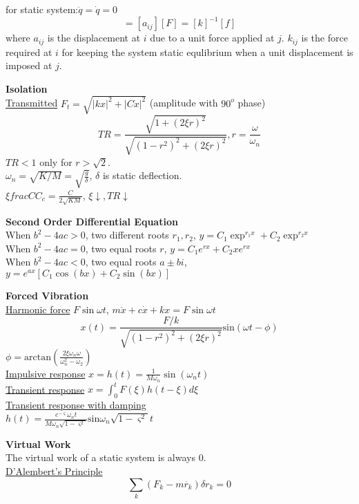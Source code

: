 \documentclass{article}
\begin{document}
\begin{multicols*}{3}
for static system:$\ddot{q}=\dot{q}=0$
\begin{equation*}
  [q]=[a_{ij}][F]=[k]^{-1}[f]
\end{equation*}
where $a_{ij}$ is the displacement at $i$ due to a unit force applied at $j$.
$k_{ij}$ is the force required at $i$ for keeping the system static equlibrium when a unit displacement is imposed at $j$.

\noindent\textbf{Isolation}\\
\underline{Transmitted} $F_{t}=\sqrt{|kx|^{2}+|C\dot{x}|^{2}}$ (amplitude with $90^{o}$ phase)
\begin{equation*}
  TR=\frac{\sqrt{1+(2\xi r)^{2}}}{\sqrt{(1-r^{2})^{2}+(2\xi r)^{2}}}, r=\frac{\omega}{\omega_{n}}
\end{equation*}
$TR<1$ only for $r> \sqrt{2}$.\\
$\omega_{n}=\sqrt{K/M}=\sqrt{\frac{g}{\delta}}$, $\delta$ is static deflection. \\
$\xi frac{C}{C_{c}}=\frac{C}{2\sqrt{KM}}$, $\xi \downarrow, TR \downarrow$

\noindent\textbf{Second Order Differential Equation}\\
 When $b^2 - 4ac > 0$, two different roots $r_1, r_2$, $y = C_1\exp^{r_1 x} + C_2\exp^{r_2 x}$ \\
 When $b^2 - 4ac = 0$, two equal roots $r$, $y = C_1 e^{r x} + C_2 x e^{r x}$\\
 When $b^2 - 4ac < 0$, two equal roots $a \pm bi$, $y = e^{ax} [C_1 \cos(b x) + C_2 \sin(b x)]$

\noindent\textbf{Forced Vibration}\\
\underline{Harmonic force} $F\sin\omega t$, $m\ddot{x} + c\dot{x} + kx = F\sin\omega t$
\begin{equation*}
  x(t)=\frac{F/k}{\sqrt{(1-r^{2})^{2}+(2\xi r)^{2}}}\text{sin}(\omega t-\phi)
\end{equation*}
$\phi=\text{arctan}(\frac{2 \xi \omega_{n}\omega}{\omega_{n}^{2}-\omega_{2}})$\\
\underline{Impulsive response} $x=h(t) = \frac{1}{M\omega_n}\sin(\omega_n t)$\\
\underline{Transient response}  $x = \int_0^t F(\xi) h(t-\xi) d\xi$\\
\underline{Transient response with damping}\\
$h(t)=\frac{e^{-\varsigma}\omega_{n}t}{M\omega_{n}\sqrt{1-\varsigma^{2}}}\text{sin}\omega_{n}\sqrt{1-\varsigma^{2}}t$

\noindent\textbf{Virtual Work}\\
The virtual work of a static system is always 0.\\
\underline{D'Alembert's Principle}
\begin{equation*}
  \sum_k (F_k - m \ddot{r_k}) \delta r_k = 0
\end{equation*}


\end{multicols*}
\end{document}
